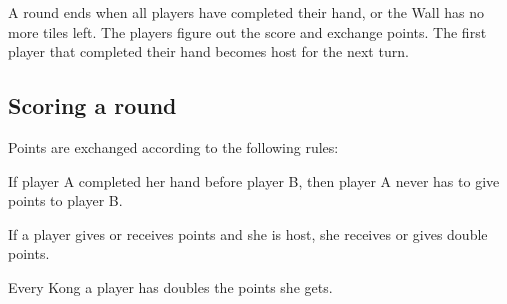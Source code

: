 \documentclass{article}
\begin{document}
A round ends when all players have completed their hand, or the Wall has no more tiles left. The players figure out the score and exchange points. The first player that completed their hand becomes host for the next turn.

\subsection{Scoring a round}
Points are exchanged according to the following rules:
\begin{itemize*}
    \item If player A completed her hand before player B, then player A never has to give points to player B.
    \item If a player gives or receives points and she is host, she receives or gives double points.
    \item Every Kong a player has doubles the points she gets.

\end{itemize*}

\end{document}

